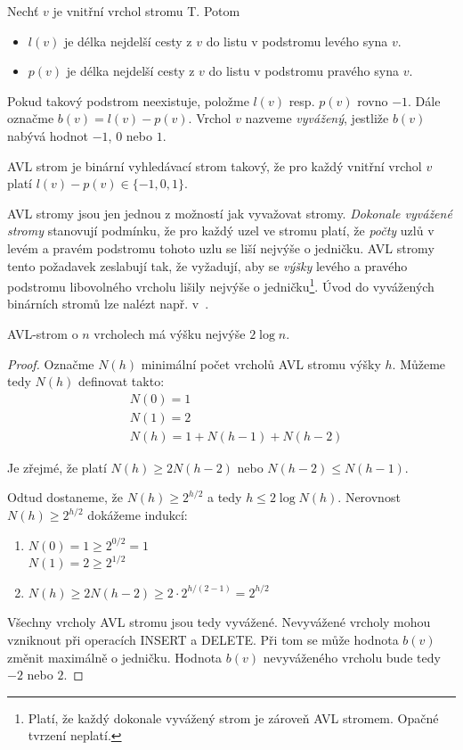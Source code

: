 \begin{defn}
Nechť $v$ je vnitřní vrchol stromu T. Potom 
\begin{itemize}
  \item $l(v)$ je délka nejdelší cesty z $v$ do listu v podstromu 
  	levého syna $v$.
  \item $p(v)$ je délka nejdelší cesty z $v$ do listu v podstromu 
  	pravého syna $v$. 
\end{itemize}
Pokud takový podstrom neexistuje, položme $l(v)$ resp. $p(v)$ rovno $-1$.
Dále označme $b(v) = l(v) - p(v)$. Vrchol $v$ nazveme \emph{vyvážený}, 
jestliže $b(v)$ nabývá hodnot $-1$, $0$ nebo $1$.
\end{defn}

\begin{defn}
\label{avl:definice}
AVL strom je binární vyhledávací strom takový, že pro každý vnitřní vrchol
$v$ platí $l(v) - p(v) \in \{-1,0,1\}$.
\end{defn}

\begin{pozn}
AVL stromy jsou jen jednou z možností jak vyvažovat stromy. 
\emph{Dokonale vyvážené stromy} stanovují podmínku, že pro každý uzel ve
stromu platí, že \emph{počty} uzlů v levém a pravém podstromu tohoto 
uzlu se liší nejvýše o jedničku. AVL stromy tento požadavek zeslabují
tak, že vyžadují, aby se \emph{výšky} levého a pravého podstromu libovolného
vrcholu lišily nejvýše o jedničku\footnote{Platí, že každý dokonale
vyvážený strom je zároveň AVL stromem. Opačné tvrzení neplatí.}.
Úvod do vyvážených binárních stromů lze nalézt např. v~\cite{Topfer}.
\end{pozn}

\begin{theorem}
AVL-strom o $n$ vrcholech má výšku nejvýše $2 \log n$.
\end{theorem}

\begin{proof}
Označme $N(h)$ minimální počet vrcholů AVL stromu výšky $h$. Můžeme tedy
$N(h)$ definovat takto:
\begin{align*}
&N(0) = 1 \\
&N(1) = 2 \\
&N(h) = 1 + N(h-1) + N(h-2)
\end{align*}

Je zřejmé, že platí $N(h) \geq 2 N(h-2)$ nebo $N(h-2) \leq N(h-1)$. 

Odtud dostaneme, že $N(h) \geq 2^{h/2}$ a tedy
$h \leq 2 \log N(h)$. Nerovnost $N(h) \geq 2^{h/2}$ dokážeme indukcí:

\begin{enumerate}
  \item $N(0) = 1 \geq 2^{0/2} = 1$ \\
   	$N(1) = 2 \geq 2^{1/2}$
  \item $N(h) \geq 2 N(h-2) \geq 2 \cdot 2^{h/(2-1)} = 2^{h/2}$
\end{enumerate}

Všechny vrcholy AVL stromu jsou tedy vyvážené. Nevyvážené vrcholy mohou
vzniknout při operacích INSERT a DELETE. Při tom se může hodnota $b(v)$
změnit maximálně o jedničku. Hodnota $b(v)$ nevyváženého vrcholu bude tedy
$-2$ nebo $2$.
\end{proof}


